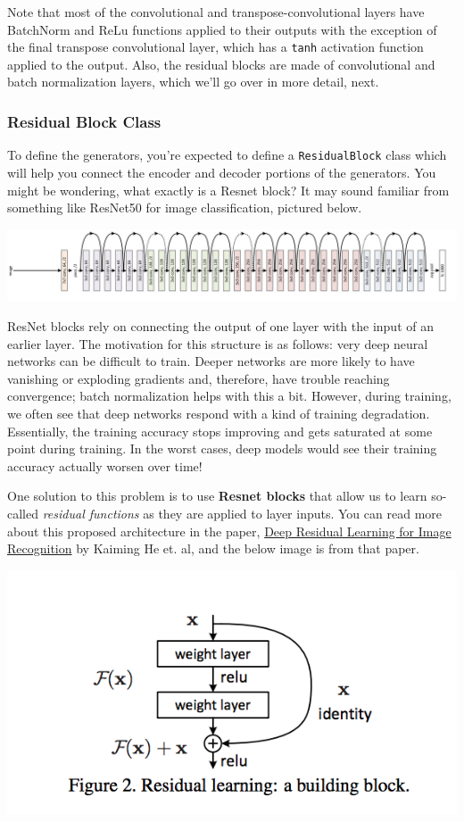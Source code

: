 Note that most of the convolutional and transpose-convolutional layers
have BatchNorm and ReLu functions applied to their outputs with the
exception of the final transpose convolutional layer, which has a
\lstinline{tanh} activation function applied to the
output. Also, the residual blocks are made of convolutional and batch
normalization layers, which we'll go over in more detail, next.
\subsubsection{Residual Block Class}
To define the generators, you're expected to define a
\lstinline{ResidualBlock} class which will help you
connect the encoder and decoder portions of the generators. You might be
wondering, what exactly is a Resnet block? It may sound familiar from
something like ResNet50 for image classification, pictured below.

\includegraphics[width=1\linewidth]{img//genAdvNet//image2image/resnet_50.png}

ResNet blocks rely on connecting the output of one layer with the input
of an earlier layer. The motivation for this structure is as follows:
very deep neural networks can be difficult to train. Deeper networks are
more likely to have vanishing or exploding gradients and, therefore,
have trouble reaching convergence; batch normalization helps with this a
bit. However, during training, we often see that deep networks respond
with a kind of training degradation. Essentially, the training accuracy
stops improving and gets saturated at some point during training. In the
worst cases, deep models would see their training accuracy actually
worsen over time! \newline

One solution to this problem is to use \textbf{Resnet blocks} that allow
us to learn so-called \emph{residual functions} as they are applied to
layer inputs. You can read more about this proposed architecture in the
paper, \href{https://arxiv.org/pdf/1512.03385.pdf}{Deep Residual
Learning for Image Recognition} by Kaiming He et. al, and the below
image is from that paper.

\includegraphics[width=0.5\linewidth]{img//genAdvNet//image2image/resnet_block.png}

